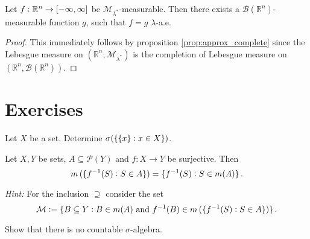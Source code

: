 \begin{corollary}
	Let $f: \mathbb{R}^n \to \intcc[0]{-\infty,\infty}$ be $\mathcal{M}_{\lambda^*}$-measurable. Then there exists a $\mathcal{B}(\mathbb{R}^n)$-measurable function $g$, such that $f = g$ $\lambda$-a.e.
\end{corollary}

\begin{proof}
	This immediately follows by proposition \ref{prop:approx_complete} since the Lebesgue measure on $(\mathbb{R}^n,\mathcal{M}_{\lambda^*})$ is the completion of Lebesgue measure on $(\mathbb{R}^n,\mathcal{B}(\mathbb{R}^n))$.
\end{proof}

\section*{Exercises}

\begin{exercise}
	Let $X$ be a set. Determine $\sigma(\cbr[0]{\cbr[0]{x} : x \in X})$.
\end{exercise}

\begin{exercise}
	Let $X,Y$ be sets, $A \subseteq \mathcal{P}(Y)$ and $f: X \to Y$ be surjective. Then 
	\begin{equation}
		m\del[0]{\cbr[0]{f^{-1}(S) : S \in A}} = \cbr[0]{f^{-1}(S) : S \in m(A)}.
	\end{equation}

	\textit{Hint:} For the inclusion $\supseteq$ consider the set 
	\begin{equation}
		\mathcal{M} := \cbr[0]{B \subseteq Y : B \in m(A) \text{ and } f^{-1}(B) \in m\del[0]{\cbr[0]{f^{-1}(S) : S \in A}}}.
	\end{equation}
\end{exercise}

\begin{exercise}
	Show that there is no countable $\sigma$-algebra.
\end{exercise}

\begin{exercise}
	
\end{exercise}
